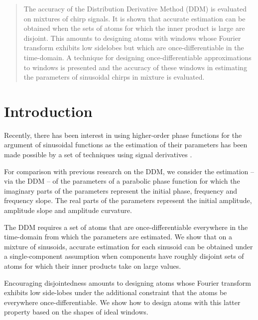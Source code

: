 \documentclass[plainsections,landscape]{sciposter}
\begin{document}
\setlength{\columnseprule}{0pt}
\begin{multicols}{3}

\begin{abstract}
    The accuracy of the Distribution Derivative Method (DDM)
    \cite{betser2009sinusoidal} is evaluated on mixtures of chirp signals. It is
    shown that accurate estimation can be obtained when the sets of atoms for
    which the inner product is large are disjoint.  This amounts to designing
    atoms with windows whose Fourier transform exhibits low sidelobes but which
    are once-differentiable in the time-domain. A technique for designing
    once-differentiable approximations to windows is presented and the accuracy
    of these windows in estimating the parameters of sinusoidal chirps in
    mixture is evaluated.
\end{abstract}

\section{Introduction}
\label{sec:intro}

Recently, there has
been interest in using higher-order phase functions for the argument of sinusoidal
    functions \cite{xuepiecewise} as the estimation of
their parameters has been made possible by a set of techniques 
using signal derivatives \cite{hamilton2012unified}.

For comparison with previous research on the DDM, we consider the estimation -- via the DDM -- of the parameters of a
    parabolic phase function for which the imaginary parts of the parameters
    represent the initial phase, frequency and frequency slope. The real parts
    of the parameters represent the initial amplitude, amplitude slope and
    amplitude curvature.

The DDM requires a set of atoms that are once-differentiable everywhere in
    the time-domain from which the parameters are estimated. We
    show that on a mixture of sinusoids, accurate estimation for each sinusoid
    can be obtained under a single-component
assumption when components have roughly disjoint sets of atoms for which their
inner products take on large values. 

Encouraging disjointedness amounts to designing atoms whose Fourier
    transform exhibits low side-lobes under the additional constraint that
    the atoms be everywhere once-differentiable. We show how to design atoms
    with this latter property based on the shapes of ideal windows.


\end{multicols}
\end{document}
